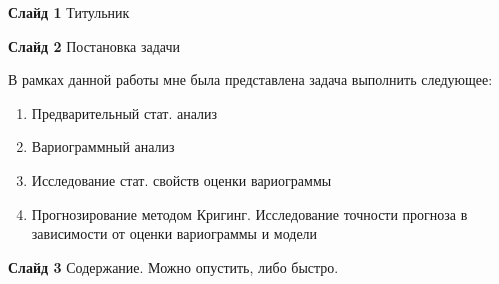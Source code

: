 \documentclass[a4paper,10pt]{report}
\begin{document}
\textbf{Слайд 1} Титульник

\textbf{Слайд 2} Постановка задачи

В рамках данной работы мне была представлена задача выполнить следующее:
\begin{enumerate}
	\item Предварительный стат. анализ
	\item Вариограммный анализ
	\item Исследование стат. свойств оценки вариограммы
	\item Прогнозирование методом Кригинг. Исследование точности прогноза в зависимости от оценки вариограммы и модели
\end{enumerate}

\textbf{Слайд 3} Содержание. Можно опустить, либо быстро.
\end{document}
